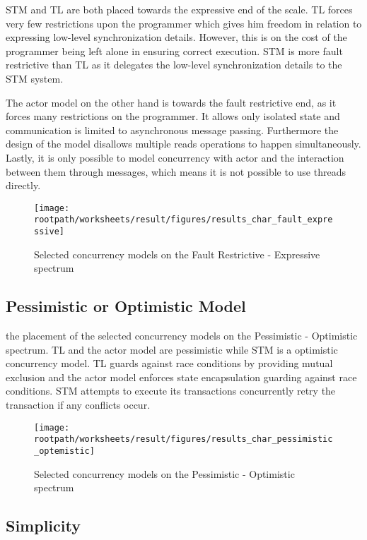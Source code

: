 \ac{STM} and \ac{TL} are both placed towards the expressive end of the scale. \ac{TL} forces very few restrictions upon the programmer which gives him freedom in relation to expressing low-level synchronization details. However, this is on the cost of the programmer being left alone in ensuring correct execution. \ac{STM} is more fault restrictive than \ac{TL} as it delegates the low-level synchronization details to the STM system. 

The actor model on the other hand is towards the fault restrictive end, as it forces many restrictions on the programmer. It allows only isolated state and communication is limited to asynchronous message passing. Furthermore the design of the model disallows multiple reads operations to happen simultaneously. Lastly, it is only possible to model concurrency with actor and the interaction between them through messages, which means it is not possible to use threads directly.

\begin{figure}[htbp]
\centering
 \texttt{[image: \\rootpath/worksheets/result/figures/results\_char\_fault\_expressive]} 
 \caption{Selected concurrency models on the Fault Restrictive - Expressive spectrum}
\label{fig:results_char_fault_expressive}
\end{figure}

\subsection{Pessimistic or Optimistic Model}
 the placement of the selected concurrency models on the Pessimistic - Optimistic spectrum. \ac{TL} and the actor model are pessimistic while \ac{STM} is a optimistic concurrency model. \ac{TL} guards against race conditions by providing mutual exclusion and the actor model enforces state encapsulation guarding against race conditions. \ac{STM} attempts to execute its transactions concurrently retry the transaction if any conflicts occur.

\begin{figure}[htbp]
\centering
 \texttt{[image: \\rootpath/worksheets/result/figures/results\_char\_pessimistic\_optemistic]} 
 \caption{Selected concurrency models on the Pessimistic - Optimistic spectrum}
\label{fig:results_char_pes_opti}
\end{figure}

\subsection{Simplicity}

